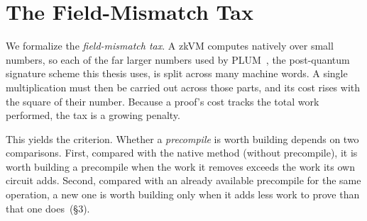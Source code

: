 \section{The Field-Mismatch Tax}
We formalize the \emph{field-mismatch tax}. A zkVM computes natively over small numbers, so each of the far larger numbers used by PLUM~\cite{10.1007/978-981-95-2961-2_6}, the post-quantum signature scheme this thesis uses, is split across many machine words. A single multiplication must then be carried out across those parts, and its cost rises with the square of their number. Because a proof's cost tracks the total work performed, the tax is a growing penalty.

This yields the criterion. Whether a \emph{precompile} is worth building depends on two comparisons. First, compared with the native method (without precompile), it is worth building a precompile when the work it removes exceeds the work its own circuit adds. Second, compared with an already available precompile for the same operation, a new one is worth building only when it adds less work to prove than that one does~(\S3).